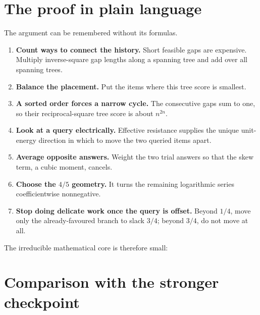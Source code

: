 \documentclass[11pt]{article}
\theoremstyle{definition}
\newcommand{\1}{\mathbf{1}}
\begin{document}
\section{The proof in plain language}

The argument can be remembered without its formulas.

\begin{enumerate}[label=\textbf{\arabic*.},leftmargin=2.3em]
\item \textbf{Count ways to connect the history.}  Short feasible gaps are expensive.  Multiply inverse-square gap lengths along a spanning tree and add over all spanning trees.
\item \textbf{Balance the placement.}  Put the items where this tree score is smallest.
\item \textbf{A sorted order forces a narrow cycle.}  The consecutive gaps sum to one, so their reciprocal-square tree score is about $n^{2n}$.
\item \textbf{Look at a query electrically.}  Effective resistance supplies the unique unit-energy direction in which to move the two queried items apart.
\item \textbf{Average opposite answers.}  Weight the two trial answers so that the skew term, a cubic moment, cancels.
\item \textbf{Choose the $4/5$ geometry.}  It turns the remaining logarithmic series coefficientwise nonnegative.
\item \textbf{Stop doing delicate work once the query is offset.}  Beyond $1/4$, move only the already-favoured branch to slack $3/4$; beyond $3/4$, do not move at all.
\end{enumerate}

The irreducible mathematical core is therefore small:

\begin{center}
\end{center}

\section{Comparison with the stronger checkpoint}
\end{document}
